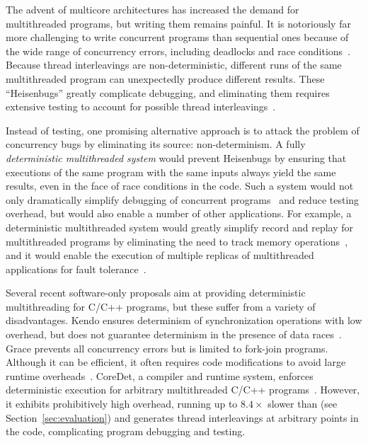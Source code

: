 \label{sec:introduction}

The advent of multicore architectures has increased the demand for multithreaded
programs, but writing them remains painful. It is notoriously far more
challenging to write concurrent programs than sequential ones because of the
wide range of concurrency errors, including deadlocks and race
conditions~\cite{havender,76897,130623}. Because thread interleavings are
non-deterministic, different runs of the same multithreaded program can
unexpectedly produce different results. These ``Heisenbugs'' greatly complicate
debugging, and eliminating them requires extensive testing to account for
possible thread
interleavings~\cite{DBLP:conf/icse/BallBHMQ09,DBLP:conf/asplos/BurckhardtKMN10}.


Instead of testing, one promising alternative approach is to attack the problem
of concurrency bugs by eliminating its source: non-determinism. A fully
\emph{deterministic multithreaded system} would prevent Heisenbugs by ensuring
that executions of the same program with the same inputs always yield the same
results, even in the face of race conditions in the code. Such a system would
not only dramatically simplify debugging of concurrent
programs~\cite{Carver:1991:RTC:624586.625040} and reduce testing overhead, but
would also enable a number of other applications. For example, a deterministic
multithreaded system would greatly simplify record and replay for multithreaded
programs by eliminating the need to track memory
operations~\cite{Choi:1998:DRJ:281035.281041,LeBlanc:1987:DPP:32387.32396}, and
it would enable the execution of multiple replicas of multithreaded applications
for fault
tolerance~\cite{deterministic-process-groups,1134000,224058,replicant-hotos}.

Several recent software-only proposals aim at providing deterministic
multithreading for C/C++ programs, but these suffer from a variety of
disadvantages. Kendo ensures determinism of synchronization operations with low
overhead, but does not guarantee determinism in the presence of data
races~\cite{1508256}. Grace prevents all concurrency errors but is limited to
fork-join programs. Although it can be efficient, it often requires code
modifications to avoid large runtime overheads~\cite{grace}. CoreDet, a compiler
and runtime system, enforces deterministic execution for arbitrary multithreaded
C/C++ programs~\cite{Bergan:2010:CCR:1736020.1736029}. However, it exhibits
prohibitively high overhead, running up to $8.4\times$ slower than \pthreads{}
(see Section~\ref{sec:evaluation}) and generates thread interleavings at
arbitrary points in the code, complicating program debugging and testing.

